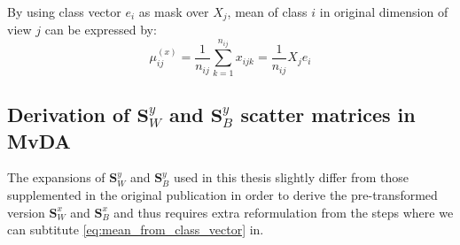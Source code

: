 \begin{appendix}
By using class vector $e_i$ as mask over $X_j$, mean of class $i$ in original dimension of view $j$ can be expressed by:
\begin{equation}
    \mu^{(x)}_{ij} = \frac{1}{n_{ij}}\sum_{k=1}^{n_{ij}}x_{ijk} = \frac{1}{n_{ij}}X_j e_i
    \label{eq:mean_from_class_vector}
\end{equation}

\subsection{Derivation of \texorpdfstring{$\boldsymbol{S}^y_W$}{intra-class} and \texorpdfstring{$\boldsymbol{S}^y_B$}{inter-class} scatter matrices in MvDA} \label{subsec:derivation_mvda}
    The expansions of $\boldsymbol{S}^y_W$ and $\boldsymbol{S}^y_B$ used in this thesis slightly differ from those supplemented in the original publication \cite{kan2015multi} in order to derive the pre-transformed version $\boldsymbol{S}^x_W$ and $\boldsymbol{S}^x_B$ and thus requires extra reformulation from the steps where we can subtitute \eqref{eq:mean_from_class_vector} in.


\end{appendix}
